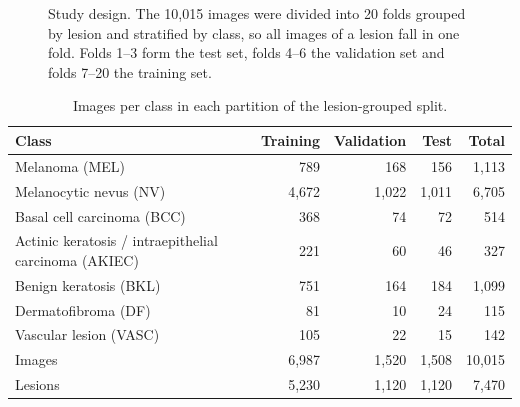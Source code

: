 \documentclass[11pt,a4paper]{article}
\begin{document}
\begin{figure}[ht]
\centering
{}
\caption{Study design. The 10,015 images were divided into 20 folds grouped by lesion and stratified by class, so all images of a lesion fall in one fold. Folds 1--3 form the test set, folds 4--6 the validation set and folds 7--20 the training set.}
\label{fig:split}
\end{figure}

\begin{table}[ht]
\centering
\caption{Images per class in each partition of the lesion-grouped split.}
\label{tab:split}
\small
\begin{tabular}{@{}lrrrr@{}}
\toprule
Class & Training & Validation & Test & Total \\
\midrule
Melanoma (MEL) & 789 & 168 & 156 & 1,113 \\
Melanocytic nevus (NV) & 4,672 & 1,022 & 1,011 & 6,705 \\
Basal cell carcinoma (BCC) & 368 & 74 & 72 & 514 \\
Actinic keratosis / intraepithelial carcinoma (AKIEC) & 221 & 60 & 46 & 327 \\
Benign keratosis (BKL) & 751 & 164 & 184 & 1,099 \\
Dermatofibroma (DF) & 81 & 10 & 24 & 115 \\
Vascular lesion (VASC) & 105 & 22 & 15 & 142 \\
\midrule
Images & 6,987 & 1,520 & 1,508 & 10,015 \\
Lesions & 5,230 & 1,120 & 1,120 & 7,470 \\
\bottomrule
\end{tabular}
\end{table}
\end{document}
